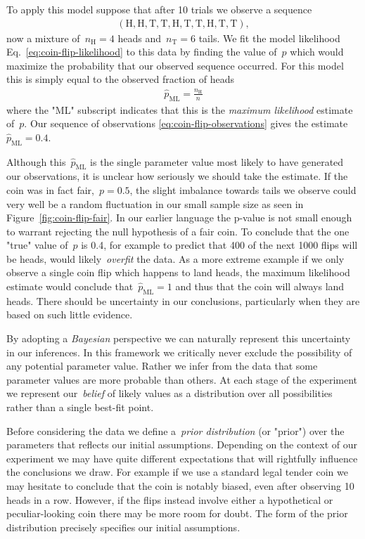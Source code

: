 To apply this model suppose that after 10 trials we observe a sequence \begin{align}
    (\text{H}, \text{H}, \text{T}, \text{T}, \text{H}, \text{T}, \text{T}, \text{H}, \text{T}, \text{T}), \label{eq:coin-flip-observations}
\end{align}
now a mixture of~$n_\text{H} = 4$ heads and~$n_{\text{T}} = 6$ tails. We fit the model likelihood Eq.~\eqref{eq:coin-flip-likelihood} to this data by finding the value of~$p$ which would maximize the probability that our observed sequence occurred. For this model this is simply equal to the observed fraction of heads \begin{align}
    \hat{p}_{\text{ML}} = \frac{n_\text{H}}{n}
\end{align} where the "ML" subscript indicates that this is the \emph{maximum likelihood} estimate of~$p$. Our sequence of observations \eqref{eq:coin-flip-observations} gives the estimate~$\hat{p}_{\text{ML}} = 0.4$. 

Although this~$\hat{p}_{\text{ML}}$ is the single parameter value most likely to have generated our observations, it is unclear how seriously we should take the estimate. If the coin was in fact fair,~$p = 0.5$, the slight imbalance towards tails we observe could very well be a random fluctuation in our small sample size as seen in Figure~\ref{fig:coin-flip-fair}. In our earlier language the p-value is not small enough to warrant rejecting the null hypothesis of a fair coin. To conclude that the one "true" value of~$p$ is 0.4, for example to predict that 400 of the next 1000 flips will be heads, would likely~\emph{overfit} the data. As a more extreme example if we only observe a single coin flip which happens to land heads, the maximum likelihood estimate would conclude that~$\hat{p}_{\text{ML}} = 1$ and thus that the coin will always land heads. There should be uncertainty in our conclusions, particularly when they are based on such little evidence. 

By adopting a \emph{Bayesian} perspective we can naturally represent this uncertainty in our inferences. In this framework we critically never exclude the possibility of any potential parameter value. Rather we infer from the data that some parameter values are more probable than others. At each stage of the experiment we represent our~\emph{belief} of likely values as a distribution over all possibilities rather than a single best-fit point. 

Before considering the data we define a~\emph{prior distribution} (or "prior") over the parameters that reflects our initial assumptions. Depending on the context of our experiment we may have quite different expectations that will rightfully influence the conclusions we draw. For example if we use a standard legal tender coin we may hesitate to conclude that the coin is notably biased, even after observing 10 heads in a row. However, if the flips instead involve either a hypothetical or peculiar-looking coin there may be more room for doubt. The form of the prior distribution precisely specifies our initial assumptions.

